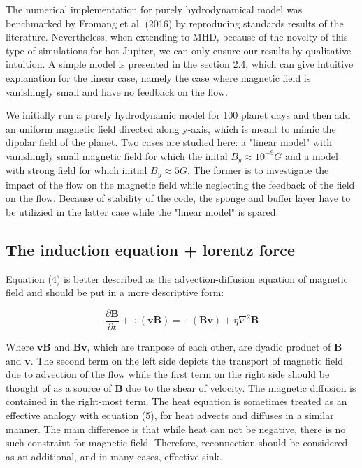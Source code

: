 \documentclass[11pt]{article}
\begin{document}
The numerical implementation for purely hydrodynamical model was benchmarked by Fromang et al. (2016) by reproducing standards results of the literature. Nevertheless, when extending to MHD, because of the novelty of this type of simulations for hot Jupiter, we can only ensure our results by qualitative intuition. A simple model is presented in the section 2.4, which can give intuitive explanation for the linear case, namely the case where magnetic field is vanishingly small and have no feedback on the flow. 

We initially run a purely hydrodynamic model for 100 planet days and then add an uniform magnetic field directed along y-axis, which is meant to mimic the dipolar field of the planet. Two cases are studied here: a "linear model" with vanishingly small magnetic field for which the inital $B_y \approx 10^{-9} G$  and a model with strong field for which initial $B_y \approx 5G $. The former is to investigate the impact of the flow on the magnetic field while neglecting the feedback of the field on the flow. Because of stability of the code, the sponge and buffer layer have to be utilizied in the latter case while the "linear model" is spared.

\subsection{The induction equation + lorentz force} 

Equation (4) is better described as the advection-diffusion equation of magnetic field and should be put in a more descriptive form: 

\begin{equation}
\frac{\partial \bm{B}}{\partial t} + \div (\bm{v}\bm{B})   = \div(\bm{B}\bm{v}) + \eta \nabla^2 \bm{B}
\end{equation}

Where $\bm{v}\bm{B}$ and $\bm{B}\bm{v}$, which are tranpose of each other, are dyadic product of $\bm{B}$ and $\bm{v}$. The second term on the left side depicts the transport of magnetic field due to advection of the flow while the first term on the right side should be thought of as a source of $\bm{B}$ due to the shear of velocity. The magnetic diffusion is contained in the right-most term.  The heat equation is sometimes treated as an effective analogy with equation (5), for heat advects and diffuses in a similar manner. The main difference is that while heat can not be negative, there is no such constraint for magnetic field. Therefore, reconnection should be considered as an additional, and in many cases, effective sink. 
\end{document}
